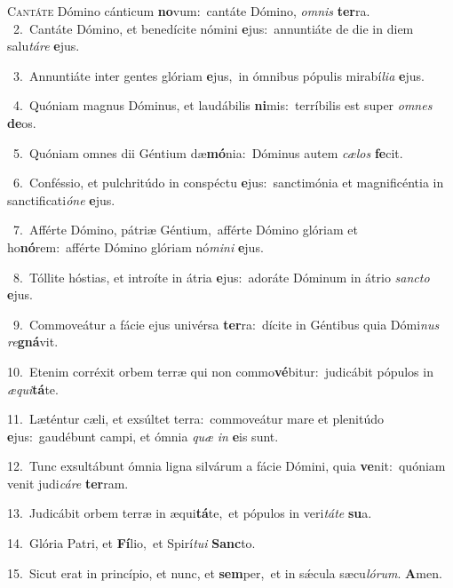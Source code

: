 \lettrine{\initial\textcolor{\initialcolor}{C}}{antáte} Dómino cánticum \textbf{no}\-vum:~\star cantáte Dómino, \textit{om}\-\textit{nis} \textbf{ter}\-ra.\\
{\numbfont\textcolor{\numbcolor}{~2.}}~Cantáte Dómino, et benedícite nómini \textbf{e}\-jus:~\star annuntiáte de die in diem salu\-\textit{tá}\-\textit{re} \textbf{e}\-jus.\par
{\numbfont\textcolor{\numbcolor}{~3.}}~Annuntiáte inter gentes glóriam \textbf{e}\-jus,~\star in ómnibus pópulis mirabí\-\textit{li}\-\textit{a} \textbf{e}\-jus.\par
{\numbfont\textcolor{\numbcolor}{~4.}}~Quóniam magnus Dóminus, et laudábilis \textbf{ni}\-mis:~\star terríbilis est super \textit{om}\-\textit{nes} \textbf{de}\-os.\par
{\numbfont\textcolor{\numbcolor}{~5.}}~Quóniam omnes dii Géntium dæ\-\textbf{mó}\-nia:~\star Dóminus autem \textit{cæ}\-\textit{los} \textbf{fe}\-cit.\par
{\numbfont\textcolor{\numbcolor}{~6.}}~Conféssio, et pulchritúdo in conspéctu \textbf{e}\-jus:~\star sanctimónia et magnificéntia in sanctificati\-\textit{ó}\-\textit{ne} \textbf{e}\-jus.\par
{\numbfont\textcolor{\numbcolor}{~7.}}~Afférte Dómino, pátriæ Géntium,~\dagger afférte Dómino glóriam et ho\-\textbf{nó}\-rem:~\star afférte Dómino glóriam nó\-\textit{mi}\-\textit{ni} \textbf{e}\-jus.\par
{\numbfont\textcolor{\numbcolor}{~8.}}~Tóllite hóstias, et introíte in átria \textbf{e}\-jus:~\star adoráte Dóminum in átrio \textit{sanc}\-\textit{to} \textbf{e}\-jus.\par
{\numbfont\textcolor{\numbcolor}{~9.}}~Commoveátur a fácie ejus univérsa \textbf{ter}\-ra:~\star dícite in Géntibus quia Dómi\textit{nus} \textit{re}\-\textbf{gná}vit.\par
{\numbfont\textcolor{\numbcolor}{10.}}~Etenim corréxit orbem terræ qui non commo\-\textbf{vé}\-bitur:~\star judicábit pópulos in \textit{æ}\-\textit{qui}\textbf{tá}te.\par
{\numbfont\textcolor{\numbcolor}{11.}}~Læténtur cæli, et exsúltet terra:~\dagger commoveátur mare et plenitúdo \textbf{e}\-jus:~\star gaudébunt campi, et ómnia \textit{quæ} \textit{in} \textbf{e}\-is sunt.\par
{\numbfont\textcolor{\numbcolor}{12.}}~Tunc exsultábunt ómnia ligna silvárum a fácie Dómini, quia \textbf{ve}\-nit:~\star quóniam venit judi\-\textit{cá}\-\textit{re} \textbf{ter}\-ram.\par
{\numbfont\textcolor{\numbcolor}{13.}}~Judicábit orbem terræ in æqui\-\textbf{tá}\-te,~\star et pópulos in veri\-\textit{tá}\-\textit{te} \textbf{su}\-a.\par
{\numbfont\textcolor{\numbcolor}{14.}}~Glória Patri, et \textbf{Fí}\-lio,~\star et Spirí\-\textit{tu}\-\textit{i} \textbf{Sanc}\-to.\par
{\numbfont\textcolor{\numbcolor}{15.}}~Sicut erat in princípio, et nunc, et \textbf{sem}\-per,~\star et in sǽcula sæcu\-\textit{ló}\-\textit{rum}. \textbf{A}\-men.\par

